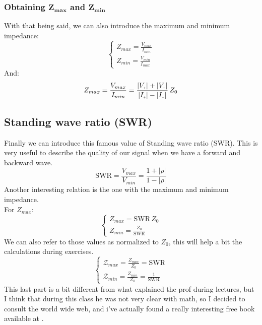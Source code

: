 \subsubsection*{Obtaining $\bm{Z_{max}}$ and $\bm{Z_{min}}$}
With that being said, we can also introduce the maximum and minimum\\
impedance:
\begin{equation}
    \begin{cases}
        Z_{max} = \frac{V_{max}}{I_{min}}\\
        Z_{min} = \frac{V_{min}}{I_{max}}
    \end{cases}
\end{equation}
And:
\begin{equation}
    Z_{max}=\frac{V_{max}}{I_{min}}=\frac{|V\bottomPlus|+|V\bottomMinus|}{|I\bottomPlus|-|I\bottomMinus|}\,Z_0
\end{equation}
\subsection*{Standing wave ratio (SWR)}
Finally we can introduce this famous value of Standing wave ratio (SWR). This is very useful to describe the quality of our signal when we have a forward and backward wave.
\begin{equation}\label{eq:swr_def}
    \text{SWR}=\frac{V_{max}}{V_{min}}=\frac{1+|\rho|}{1-|\rho|}
\end{equation}
Another interesting relation is the one with the maximum and minimum\\
impedance.\\
For $Z_{max}$:
\begin{equation}
    \begin{cases}
        Z_{max} = \text{SWR}\,Z_0 \\
        Z_{min} = \frac{Z_0}{\text{SWR}}
    \end{cases}
\end{equation}
We can also refer to those values as normalized to $Z_0$, this will help a bit the calculations during exercises.
\begin{equation}
    \begin{cases}\label{eq:normalized_impedance}
        \mathcal{Z}_{max} = \frac{Z_{max}}{Z_0}=\text{SWR}\\
        \mathcal{Z}_{min} = \frac{Z_{min}}{Z_0}=\frac{1}{\text{SWR}}
    \end{cases}
\end{equation}
This last part is a bit different from what explained the prof during lectures, but I think that during this class he was not very clear with math, so I decided to consult the world wide web, and i've actually found a really interesting free book available at \cite{Ellingson2020Book}.
